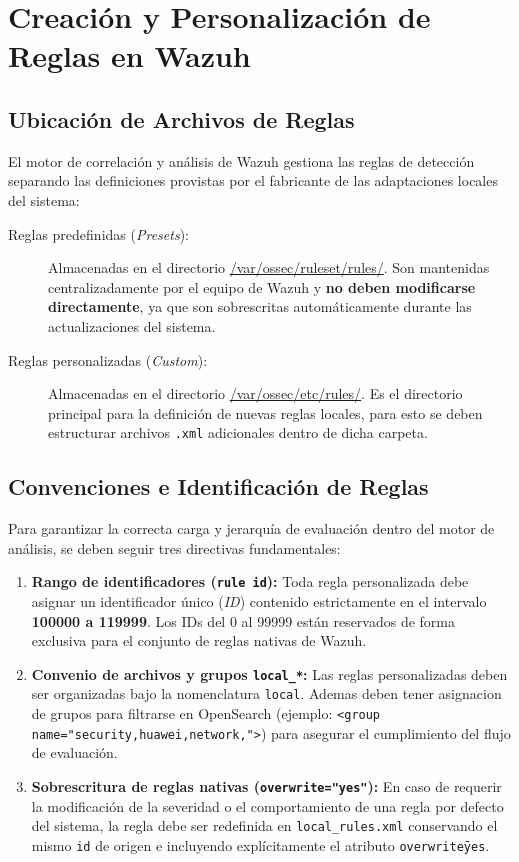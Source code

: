 \section{Creación y Personalización de Reglas en Wazuh}

\subsection{Ubicación de Archivos de Reglas}
El motor de correlación y análisis de Wazuh gestiona las reglas de detección separando las definiciones provistas por el fabricante de las adaptaciones locales del sistema:

\begin{description}
    \item[Reglas predefinidas (\textit{Presets}):] Almacenadas en el directorio \url{/var/ossec/ruleset/rules/}. Son mantenidas centralizadamente por el equipo de Wazuh y \textbf{no deben modificarse directamente}, ya que son sobrescritas automáticamente durante las actualizaciones del sistema.
    
    \item[Reglas personalizadas (\textit{Custom}):] Almacenadas en el directorio \url{/var/ossec/etc/rules/}. Es el directorio principal para la definición de nuevas reglas locales, para esto se deben estructurar archivos \texttt{.xml} adicionales dentro de dicha carpeta.
\end{description}

\subsection{Convenciones e Identificación de Reglas}

Para garantizar la correcta carga y jerarquía de evaluación dentro del motor de análisis, se deben seguir tres directivas fundamentales:

\begin{enumerate}
    \item \textbf{Rango de identificadores (\texttt{rule id}):} Toda regla personalizada debe asignar un identificador único (\textit{ID}) contenido estrictamente en el intervalo \textbf{100000 a 119999}. Los IDs del 0 al 99999 están reservados de forma exclusiva para el conjunto de reglas nativas de Wazuh.
    
    \item \textbf{Convenio de archivos y grupos \texttt{local\_*}:} Las reglas personalizadas deben ser organizadas bajo la nomenclatura \texttt{local}. Ademas deben tener asignacion de grupos para filtrarse en OpenSearch (ejemplo: \texttt{<group name="security,huawei,network,">}) para asegurar el cumplimiento del flujo de evaluación.
    
    \item \textbf{Sobrescritura de reglas nativas (\texttt{overwrite="yes"}):} En caso de requerir la modificación de la severidad o el comportamiento de una regla por defecto del sistema, la regla debe ser redefinida en \texttt{local\_rules.xml} conservando el mismo \texttt{id} de origen e incluyendo explícitamente el atributo \texttt{overwrite\=yes}.
\end{enumerate}

